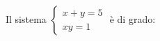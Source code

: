 Il sistema 
$\displaystyle
\left\{
\begin{array}{l}
\displaystyle x + y = 5 \\
\displaystyle xy = 1
\end{array}
\right.
$
 è di grado:
